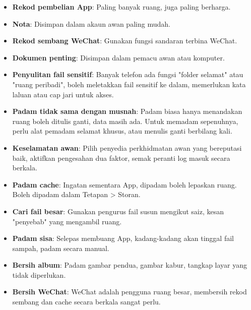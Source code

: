 \begin{itemize}
  \item \textbf{Rekod pembelian App}: Paling banyak ruang, juga paling berharga.
  \item \textbf{Nota}: Disimpan dalam akaun awan paling mudah.
  \item \textbf{Rekod sembang WeChat}: Gunakan fungsi sandaran terbina WeChat.
  \item \textbf{Dokumen penting}: Disimpan dalam pemacu awan atau komputer.
\end{itemize}


\begin{itemize}
  \item \textbf{Penyulitan fail sensitif}: Banyak telefon ada fungsi "folder selamat" atau "ruang peribadi", boleh meletakkan fail sensitif ke dalam, memerlukan kata laluan atau cap jari untuk akses.
  \item \textbf{Padam tidak sama dengan musnah}: Padam biasa hanya menandakan ruang boleh ditulis ganti, data masih ada. Untuk memadam sepenuhnya, perlu alat pemadam selamat khusus, atau menulis ganti berbilang kali.
  \item \textbf{Keselamatan awan}: Pilih penyedia perkhidmatan awan yang bereputasi baik, aktifkan pengesahan dua faktor, semak peranti log masuk secara berkala.
\end{itemize}


\begin{itemize}
  \item \textbf{Padam cache}: Ingatan sementara App, dipadam boleh lepaskan ruang. Boleh dipadam dalam Tetapan > Storan.
  \item \textbf{Cari fail besar}: Gunakan pengurus fail susun mengikut saiz, kesan "penyebab" yang mengambil ruang.
  \item \textbf{Padam sisa}: Selepas membuang App, kadang-kadang akan tinggal fail sampah, padam secara manual.
  \item \textbf{Bersih album}: Padam gambar pendua, gambar kabur, tangkap layar yang tidak diperlukan.
  \item \textbf{Bersih WeChat}: WeChat adalah pengguna ruang besar, membersih rekod sembang dan cache secara berkala sangat perlu.
\end{itemize}


